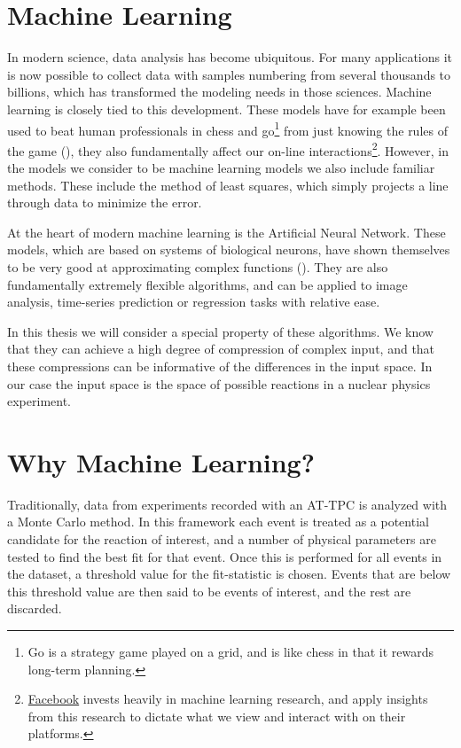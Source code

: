 \section{Machine Learning}

In modern science, data analysis has become ubiquitous. For many applications it is now possible to collect data with samples numbering from several thousands to billions, which has transformed the modeling needs in those sciences. Machine learning is closely tied to this development. These models have for example been used to beat human professionals in chess and go\footnote{Go is a strategy game played on a grid, and is like chess in that it rewards long-term planning.} from just knowing the rules of the game (\cite{Silver2017}), they also fundamentally affect our on-line interactions\footnote{\href{https://research.fb.com/category/machine-learning/}{Facebook} invests heavily in machine learning research, and apply insights from this research to dictate what we view and interact with on their platforms.}. However, in the models we consider to be machine learning models we also include familiar methods. These include the method of least squares, which simply projects a line through data to minimize the error. 

At the heart of modern machine learning is the Artificial Neural Network. These models, which are based on systems of biological neurons, have shown themselves to be very good at approximating complex functions (\cite{Lin2017}). They are also fundamentally extremely flexible algorithms, and can be applied to image analysis, time-series prediction or regression tasks with relative ease.

In this thesis we will consider a special property of these algorithms. We know that they can achieve a high degree of compression of complex input, and that these compressions can be informative of the differences in the input space. In our case the input space is the space of possible reactions in a nuclear physics experiment.

\section{Why Machine Learning?}

Traditionally, data from experiments recorded with an AT-TPC is analyzed with a Monte Carlo method. In this framework each event is treated as a potential candidate for the reaction of interest, and a number of physical parameters are tested to find the best fit for that event. Once this is performed for all events in the dataset, a threshold value for the fit-statistic is chosen. Events that are below this threshold value are then said to be events of interest, and the rest are discarded. 

